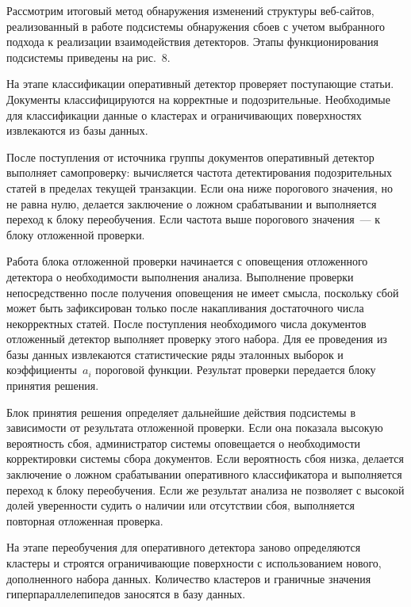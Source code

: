 \begin{multicols}{2}
    Рассмотрим итоговый метод обнаружения изменений структуры 
  веб-сай\-тов, реализованный в работе подсистемы обнаружения сбоев с 
учетом выбранного подхода к реализации взаимодействия детекторов. Этапы 
функционирования подсистемы приведены на рис.~8. 
  

  
  На этапе классификации оперативный детектор проверяет поступающие 
статьи. Документы классифицируются на корректные и подозрительные. 
Необходимые для классификации данные о кластерах и ограничивающих 
поверхностях извлекаются из базы данных.
  
    После поступления от источника группы документов оперативный детектор 
выполняет самопроверку: вычисляется частота детектирования подозрительных 
статей в пределах текущей транзакции. Если она ниже порогового значения, но 
не равна нулю, делается заключение о ложном срабатывании и выполняется 
переход к блоку переобучения. Если частота выше порогового значения~--- к 
блоку отложенной проверки.
  
        Работа блока отложенной проверки начинается с оповещения отложенного 
детектора о необходимости выполнения анализа. Выполнение проверки 
непосредственно после получения оповещения не имеет смысла, поскольку 
сбой может быть зафиксирован только после накапливания достаточного числа 
некорректных статей. После поступления необходимого числа документов 
отложенный детектор выполняет проверку этого набора. Для ее проведения из 
базы данных извлекаются статистические ряды эталонных выборок и 
коэффициенты~$a_i$ пороговой функции. Результат проверки передается блоку 
принятия решения. 
  
    Блок принятия решения определяет дальнейшие действия подсистемы в 
зависимости от результата отложенной проверки. Если она показала высокую 
вероятность сбоя, администратор системы оповещается о необходимости 
корректировки системы сбора документов. Если вероятность сбоя низка, 
делается заключение о ложном срабатывании оперативного классификатора и 
выполняется переход к блоку переобучения. Если же результат анализа не 
позволяет с высокой долей уверенности судить о наличии или отсутствии сбоя, 
выполняется повторная отложенная проверка.
  
    На этапе переобучения для оперативного детектора заново определяются 
кластеры и строятся ограничивающие поверхности с использованием нового, 
дополненного набора данных. Количество кластеров и граничные значения 
гиперпараллелепипедов заносятся в базу данных.


\end{multicols}
